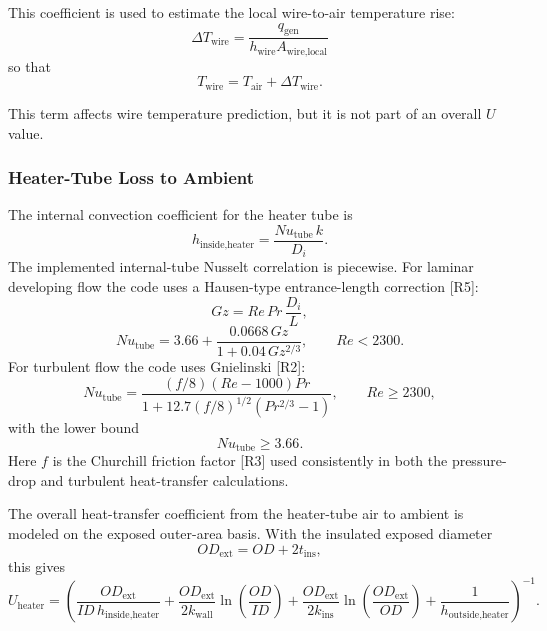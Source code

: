 \documentclass{article}
\begin{document}
This coefficient is used to estimate the local wire-to-air temperature rise:
\begin{equation}
\Delta T_{\text{wire}}=\frac{q_{\text{gen}}}{h_{\text{wire}}A_{\text{wire,local}}}
\end{equation}
so that
\begin{equation}
T_{\text{wire}}=T_{\text{air}}+\Delta T_{\text{wire}}.
\end{equation}

This term affects wire temperature prediction, but it is not part of an
overall $U$ value.

\subsubsection{Heater-Tube Loss to Ambient}

The internal convection coefficient for the heater tube is
\begin{equation}
h_{\text{inside,heater}}=\frac{Nu_{\text{tube}}\,k}{D_i}.
\end{equation}
The implemented internal-tube Nusselt correlation is piecewise. For laminar
developing flow the code uses a Hausen-type entrance-length correction [R5]:
\begin{equation}
Gz = Re\,Pr\,\frac{D_i}{L},
\end{equation}
\begin{equation}
Nu_{\text{tube}}
=
3.66+\frac{0.0668\,Gz}{1+0.04\,Gz^{2/3}},
\qquad Re<2300.
\end{equation}
For turbulent flow the code uses Gnielinski [R2]:
\begin{equation}
Nu_{\text{tube}}
=
\frac{(f/8)(Re-1000)Pr}
{1+12.7(f/8)^{1/2}(Pr^{2/3}-1)},
\qquad Re\ge 2300,
\end{equation}
with the lower bound
\begin{equation}
Nu_{\text{tube}} \ge 3.66.
\end{equation}
Here $f$ is the Churchill friction factor [R3] used consistently in both the
pressure-drop and turbulent heat-transfer calculations.

The overall heat-transfer coefficient from the heater-tube air to ambient is
modeled on the exposed outer-area basis. With the insulated exposed diameter
\begin{equation}
OD_{\text{ext}} = OD + 2t_{\text{ins}},
\end{equation}
this gives
\begin{equation}
U_{\text{heater}}
=
\left(
\frac{OD_{\text{ext}}}{ID\,h_{\text{inside,heater}}}
+\frac{OD_{\text{ext}}}{2k_{\text{wall}}}\ln\!\left(\frac{OD}{ID}\right)
+\frac{OD_{\text{ext}}}{2k_{\text{ins}}}\ln\!\left(\frac{OD_{\text{ext}}}{OD}\right)
+\frac{1}{h_{\text{outside,heater}}}
\right)^{-1}.
\end{equation}
\end{document}
